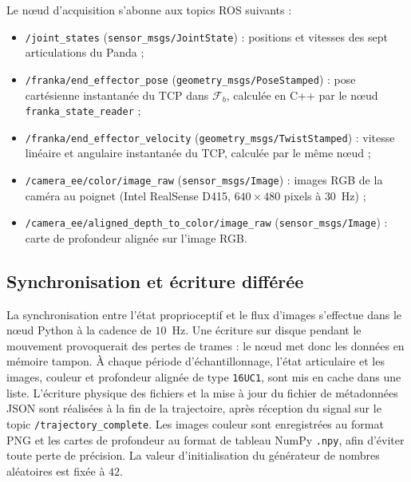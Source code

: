 Le n\oe ud d'acquisition s'abonne aux topics \ac{ROS} suivants :
\begin{itemize}
  \item \texttt{/joint\_states} (\texttt{sensor\_msgs/JointState}) : positions et vitesses des sept articulations du Panda ;
  \item \texttt{/franka/end\_effector\_pose} (\texttt{geometry\_msgs/PoseStamped}) : pose cartésienne instantanée du \ac{TCP} dans $\mathcal{F}_b$, calculée en C++ par le n\oe ud \texttt{franka\_state\_reader} ;
  \item \texttt{/franka/end\_effector\_velocity} (\texttt{geometry\_msgs/TwistStamped}) : vitesse linéaire et angulaire instantanée du \ac{TCP}, calculée par le même n\oe ud ;
  \item \texttt{/camera\_ee/color/image\_raw} (\texttt{sensor\_msgs/Image}) : images RGB de la caméra au poignet (Intel RealSense D415, $640\times480$ pixels à $30$~Hz) ;
  \item \texttt{/camera\_ee/aligned\_depth\_to\_color/image\_raw} (\texttt{sensor\_msgs/Image}) : carte de profondeur alignée sur l'image RGB.
\end{itemize}

\subsection*{Synchronisation et écriture différée} La synchronisation entre l'état proprioceptif et le flux d'images s'effectue dans le n\oe ud Python à la cadence de $10$~Hz. Une écriture sur disque pendant le mouvement provoquerait des pertes de trames : le n\oe ud met donc les données en mémoire tampon. À chaque période d'échantillonnage, l'état articulaire et les images, couleur et profondeur alignée de type \texttt{16UC1}, sont mis en cache dans une liste. L'écriture physique des fichiers et la mise à jour du fichier de métadonnées \ac{JSON} sont réalisées à la fin de la trajectoire, après réception du signal sur le topic \texttt{/trajectory\_complete}. Les images couleur sont enregistrées au format PNG et les cartes de profondeur au format de tableau NumPy \texttt{.npy}, afin d'éviter toute perte de précision. La valeur d'initialisation du générateur de nombres aléatoires est fixée à $42$.

